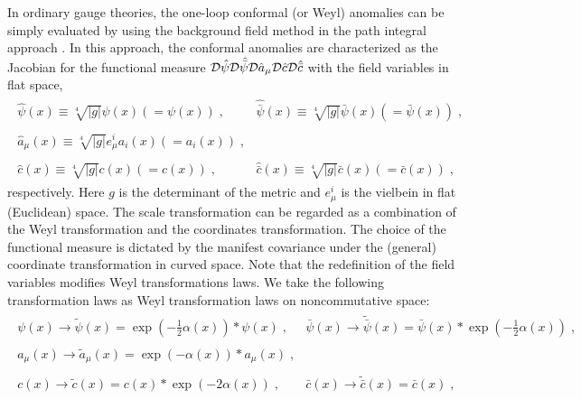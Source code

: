 \documentclass[a4paper,12pt]{article}
\begin{document}
In ordinary gauge theories, the one-loop conformal (or Weyl) anomalies can be 
simply evaluated by using the background field method in the path integral 
approach \cite{KF}. In this approach, the conformal anomalies are 
characterized as the Jacobian for the functional measure 
${\cal D}\hat{\psi} {\cal D}\hat{\bar{\psi}}
{\cal D}\hat{a}_{\mu} {\cal D}\hat{c} {\cal D}\hat{\bar{c}}$ 
with the field variables in flat space, 
%
\begin{eqnarray}
\begin{array}{ll}
\hat{\psi}(x) \equiv \sqrt[\scriptstyle 4]{|g|}\psi(x) (= \psi(x)) \;, 
& \hat{\bar{\psi}}(x) \equiv \sqrt[\scriptstyle 4]{|g|}\bar{\psi}(x) 
(= \bar{\psi}(x)) \;, \\ 
& \\
\hat{a}_{\mu}(x) \equiv \sqrt[\scriptstyle 4]{|g|}e^{i}_{\mu}a_{i}(x) 
(= a_{i}(x)) \;, 
& \\
& \\
\hat{c}(x) \equiv \sqrt[\scriptstyle 4]{|g|}c(x) (= c(x)) \;, 
& \hat{\bar{c}}(x) \equiv \sqrt[\scriptstyle 4]{|g|}\bar{c}(x) 
(= \bar{c}(x)) \;, 
\end{array}
\end{eqnarray}
%
respectively. Here $g$ is the determinant of the metric and $e^{i}_{\mu}$ is 
the vielbein in flat (Euclidean) space. 
The scale transformation can be regarded as a combination of the Weyl 
transformation and the coordinates transformation. 
The choice of the functional measure 
is dictated by the manifest covariance under the (general) coordinate 
transformation in curved space. Note that the redefinition of the field 
variables modifies Weyl transformations laws. We take the following 
transformation laws as Weyl transformation laws on noncommutative space: 
%
%
\begin{eqnarray}
\begin{array}{ll}
\psi(x) \rightarrow  \widetilde{\psi}(x) 
= \exp\left( -\frac{1}{2}\alpha(x) \right) \ast \psi(x) \;, 
& \bar{\psi}(x) \rightarrow  \widetilde{\bar{\psi}}(x) 
= \bar{\psi}(x) \ast \exp\left( -\frac{1}{2}\alpha(x) \right) \;, \\
& \\
a_{\mu}(x) \rightarrow \widetilde{a}_{\mu}(x) 
= \exp\left( -\alpha(x) \right) \ast a_{\mu}(x) \;, 
& \\
& \\
c(x) \rightarrow \widetilde{c}(x) 
= c(x) \ast \exp\left( -2\alpha(x) \right) \;, 
& \bar{c}(x) \rightarrow  \widetilde{\bar{c}}(x) 
= \bar{c}(x) \;, 
\end{array}
\end{eqnarray}
\end{document}
